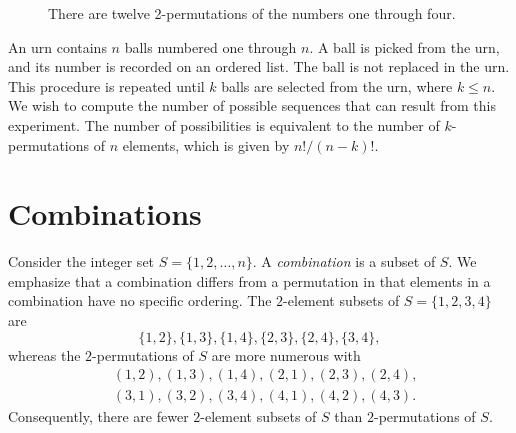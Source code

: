 \begin{figure}[htb!]
\begin{center}
\begin{footnotesize}
\end{footnotesize}
\caption{There are twelve 2-permutations of the numbers one through four.}
\label{figure:Kpermutation}
\end{center}
\end{figure}

\begin{example}
An urn contains $n$ balls numbered one through $n$.
A ball is picked from the urn, and its number is recorded on an ordered list.
The ball is not replaced in the urn.
This procedure is repeated until $k$ balls are selected from the urn, where $k \leq n$.
We wish to compute the number of possible sequences that can result from this experiment.
The number of possibilities is equivalent to the number of $k$-permutations of $n$ elements, which is given by $n! / (n-k)!$.
\end{example}


\section{Combinations}

Consider the integer set $S = \{ 1, 2, \ldots, n \}$.
A \emph{combination} is a subset of $S$. 
We emphasize that a combination differs from a permutation in that elements in a combination have no specific ordering.
The $2$-element subsets of $S = \{ 1, 2, 3, 4 \}$ are
\begin{equation*}
\{ 1, 2 \}, \{ 1, 3 \}, \{ 1, 4 \}, \{ 2, 3 \}, \{ 2, 4 \}, \{ 3, 4 \} ,
\end{equation*}
whereas the $2$-permutations of $S$ are more numerous with
\begin{equation*}
\begin{split}
&( 1, 2 ), ( 1, 3 ), ( 1, 4 ), ( 2, 1 ), ( 2, 3 ), ( 2, 4 ), \\
&( 3, 1 ), ( 3, 2 ), ( 3, 4 ), ( 4, 1 ), ( 4, 2 ), ( 4, 3 ) .
\end{split}
\end{equation*}
Consequently, there are fewer $2$-element subsets of $S$ than $2$-permutations of $S$.

